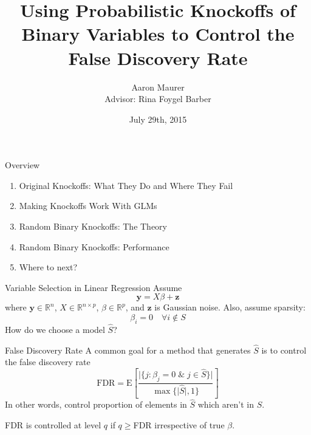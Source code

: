 \documentclass{beamer}
\title{Using Probabilistic Knockoffs of Binary Variables to Control the False Discovery Rate}
\author{Aaron Maurer \\ Advisor: Rina Foygel Barber}
\date{July 29th, 2015}
\newcommand{\R}{\mathbb{R}}
\newcommand{\E}{\mathrm{E}}
\begin{document}
\begin{frame}[plain]
    \titlepage
\end{frame}

\begin{frame}{Overview}
    \begin{enumerate} 
        \item Original Knockoffs: What They Do and Where They Fail
        \item Making Knockoffs Work With GLMs
        \item Random Binary Knockoffs: The Theory
        \item Random Binary Knockoffs: Performance
        \item Where to next?
    \end{enumerate}
\end{frame}

\begin{frame}{Variable Selection in Linear Regression}
    Assume
     \[\mathbf{y} = X\beta + \mathbf{z}\]
    where $\mathbf{y}\in\R^n$, $X \in \R^{n\times p}$, $\beta\in\R^p$, and $\mathbf z$ is Gaussian noise. Also, assume sparsity:
    \[\beta_i = 0 \quad \forall i\not\in S\]
    How do we choose a model $\hat S$?
\end{frame}

\begin{frame}{False Discovery Rate}
    A common goal for a method that generates $\hat S$ is to control the false discovery rate
    \[ \textrm{FDR} = \E\left[\frac{\vert{\{j: \beta_j=0 \; \& \; j\in\hat S\}}\vert}{\max\{\vert{\hat S}\vert,1\}} \right] \]
    In other words, control proportion of elements in $\hat S$ which aren't in $S$. \par
    \vspace{1cm}
    FDR is controlled at level $q$ if $q\geq$FDR irrespective of true $\beta$.
    
\end{frame}
\end{document}

